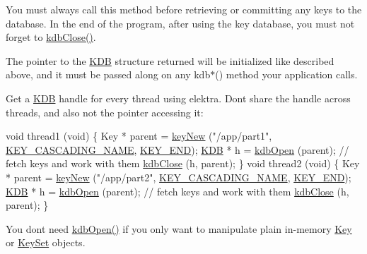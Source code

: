 You must always call this method before retrieving or committing any keys to the database. In the end of the program, after using the key database, you must not forget to \hyperlink{group__kdb_gadb54dc9fda17ee07deb9444df745c96f}{kdb\+Close()}.

The pointer to the {\ttfamily \hyperlink{classkdb_1_1KDB}{K\+DB}} structure returned will be initialized like described above, and it must be passed along on any kdb$\ast$() method your application calls.

Get a {\ttfamily \hyperlink{classkdb_1_1KDB}{K\+DB}} handle for every thread using elektra. Don\textquotesingle{}t share the handle across threads, and also not the pointer accessing it\+:


\begin{DoxyCodeInclude}
\textcolor{keywordtype}{void} thread1 (\textcolor{keywordtype}{void})
\{
        Key * parent = \hyperlink{group__key_gad23c65b44bf48d773759e1f9a4d43b89}{keyNew} (\textcolor{stringliteral}{"/app/part1"}, \hyperlink{group__key_gga91fb3178848bd682000958089abbaf40afc1567f74444ff9c219f7456b652b4ec}{KEY\_CASCADING\_NAME}, 
      \hyperlink{group__key_gga91fb3178848bd682000958089abbaf40aa8adb6fcb92dec58fb19410eacfdd403}{KEY\_END});
        \hyperlink{classkdb_1_1KDB_a7e0637995ce9f294cdbc6f167df6db40}{KDB} * h = \hyperlink{group__kdb_ga6808defe5870f328dd17910aacbdc6ca}{kdbOpen} (parent);
        \textcolor{comment}{// fetch keys and work with them}
        \hyperlink{group__kdb_gadb54dc9fda17ee07deb9444df745c96f}{kdbClose} (h, parent);
\}
\textcolor{keywordtype}{void} thread2 (\textcolor{keywordtype}{void})
\{
        Key * parent = \hyperlink{group__key_gad23c65b44bf48d773759e1f9a4d43b89}{keyNew} (\textcolor{stringliteral}{"/app/part2"}, \hyperlink{group__key_gga91fb3178848bd682000958089abbaf40afc1567f74444ff9c219f7456b652b4ec}{KEY\_CASCADING\_NAME}, 
      \hyperlink{group__key_gga91fb3178848bd682000958089abbaf40aa8adb6fcb92dec58fb19410eacfdd403}{KEY\_END});
        \hyperlink{classkdb_1_1KDB_a7e0637995ce9f294cdbc6f167df6db40}{KDB} * h = \hyperlink{group__kdb_ga6808defe5870f328dd17910aacbdc6ca}{kdbOpen} (parent);
        \textcolor{comment}{// fetch keys and work with them}
        \hyperlink{group__kdb_gadb54dc9fda17ee07deb9444df745c96f}{kdbClose} (h, parent);
\}
\end{DoxyCodeInclude}
 You don\textquotesingle{}t need \hyperlink{group__kdb_ga6808defe5870f328dd17910aacbdc6ca}{kdb\+Open()} if you only want to manipulate plain in-\/memory \hyperlink{classkdb_1_1Key}{Key} or \hyperlink{classkdb_1_1KeySet}{Key\+Set} objects.

